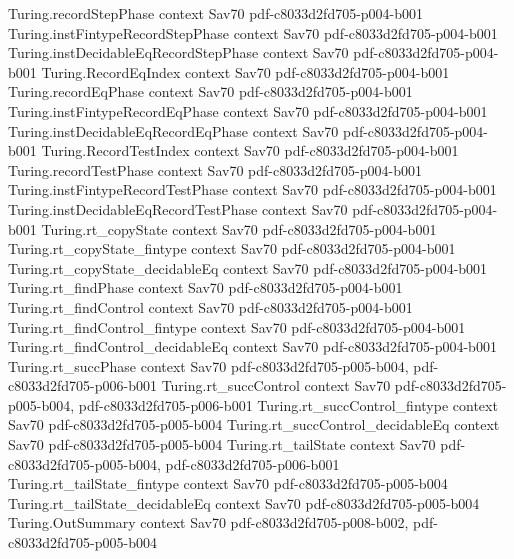 \begin{theorem}
\proofstep
  {Turing.recordStepPhase}
  {context}
  {Sav70}
  {pdf-c8033d2fd705-p004-b001}
\proofstep
  {Turing.instFintypeRecordStepPhase}
  {context}
  {Sav70}
  {pdf-c8033d2fd705-p004-b001}
\proofstep
  {Turing.instDecidableEqRecordStepPhase}
  {context}
  {Sav70}
  {pdf-c8033d2fd705-p004-b001}
\proofstep
  {Turing.RecordEqIndex}
  {context}
  {Sav70}
  {pdf-c8033d2fd705-p004-b001}
\proofstep
  {Turing.recordEqPhase}
  {context}
  {Sav70}
  {pdf-c8033d2fd705-p004-b001}
\proofstep
  {Turing.instFintypeRecordEqPhase}
  {context}
  {Sav70}
  {pdf-c8033d2fd705-p004-b001}
\proofstep
  {Turing.instDecidableEqRecordEqPhase}
  {context}
  {Sav70}
  {pdf-c8033d2fd705-p004-b001}
\proofstep
  {Turing.RecordTestIndex}
  {context}
  {Sav70}
  {pdf-c8033d2fd705-p004-b001}
\proofstep
  {Turing.recordTestPhase}
  {context}
  {Sav70}
  {pdf-c8033d2fd705-p004-b001}
\proofstep
  {Turing.instFintypeRecordTestPhase}
  {context}
  {Sav70}
  {pdf-c8033d2fd705-p004-b001}
\proofstep
  {Turing.instDecidableEqRecordTestPhase}
  {context}
  {Sav70}
  {pdf-c8033d2fd705-p004-b001}
\proofstep
  {Turing.rt_copyState}
  {context}
  {Sav70}
  {pdf-c8033d2fd705-p004-b001}
\proofstep
  {Turing.rt_copyState_fintype}
  {context}
  {Sav70}
  {pdf-c8033d2fd705-p004-b001}
\proofstep
  {Turing.rt_copyState_decidableEq}
  {context}
  {Sav70}
  {pdf-c8033d2fd705-p004-b001}
\proofstep
  {Turing.rt_findPhase}
  {context}
  {Sav70}
  {pdf-c8033d2fd705-p004-b001}
\proofstep
  {Turing.rt_findControl}
  {context}
  {Sav70}
  {pdf-c8033d2fd705-p004-b001}
\proofstep
  {Turing.rt_findControl_fintype}
  {context}
  {Sav70}
  {pdf-c8033d2fd705-p004-b001}
\proofstep
  {Turing.rt_findControl_decidableEq}
  {context}
  {Sav70}
  {pdf-c8033d2fd705-p004-b001}
\proofstep
  {Turing.rt_succPhase}
  {context}
  {Sav70}
  {pdf-c8033d2fd705-p005-b004,
    pdf-c8033d2fd705-p006-b001}
\proofstep
  {Turing.rt_succControl}
  {context}
  {Sav70}
  {pdf-c8033d2fd705-p005-b004,
    pdf-c8033d2fd705-p006-b001}
\proofstep
  {Turing.rt_succControl_fintype}
  {context}
  {Sav70}
  {pdf-c8033d2fd705-p005-b004}
\proofstep
  {Turing.rt_succControl_decidableEq}
  {context}
  {Sav70}
  {pdf-c8033d2fd705-p005-b004}
\proofstep
  {Turing.rt_tailState}
  {context}
  {Sav70}
  {pdf-c8033d2fd705-p005-b004,
    pdf-c8033d2fd705-p006-b001}
\proofstep
  {Turing.rt_tailState_fintype}
  {context}
  {Sav70}
  {pdf-c8033d2fd705-p005-b004}
\proofstep
  {Turing.rt_tailState_decidableEq}
  {context}
  {Sav70}
  {pdf-c8033d2fd705-p005-b004}
\proofstep
  {Turing.OutSummary}
  {context}
  {Sav70}
  {pdf-c8033d2fd705-p008-b002,
    pdf-c8033d2fd705-p005-b004}

\end{theorem}
